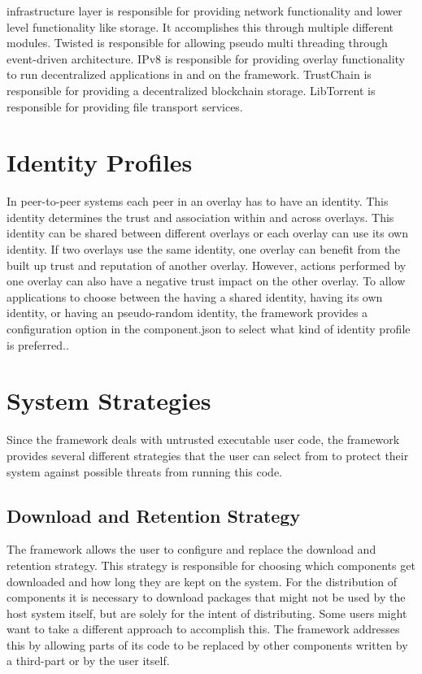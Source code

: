 infrastructure layer is responsible for providing network functionality and lower level functionality like storage. It accomplishes this through multiple different modules. Twisted is responsible for allowing pseudo multi threading through event-driven architecture. IPv8 is responsible for providing overlay functionality to run decentralized applications in and on the framework. TrustChain is responsible for providing a decentralized blockchain storage. LibTorrent is responsible for providing file transport services.

\section{Identity Profiles}

In peer-to-peer systems each peer in an overlay has to have an identity. This identity determines the trust and association within and across overlays. This identity can be shared between different overlays or each overlay can use its own identity. If two overlays use the same identity, one overlay can benefit from the built up trust and reputation of another overlay. However, actions performed by one overlay can also have a negative trust impact on the other overlay. To allow applications to choose between the having a shared identity, having its own identity, or having an pseudo-random identity,  the framework provides a configuration option in the component.json to select what kind of identity profile is preferred..  

\section{System Strategies}

Since the framework deals with untrusted executable user code, the framework provides several different strategies that the user can select from to protect their system against possible threats from running this code.

\subsection{Download and Retention Strategy}

The framework allows the user to configure and replace the download and retention strategy. This strategy is responsible for choosing which components get downloaded and how long they are kept on the system. For the distribution of components it is necessary to download packages that might not be used by the host system itself, but are solely for the intent of distributing. Some users might want to take a different approach to accomplish this. The framework addresses this by allowing parts of its code to be replaced by other components written by a third-part or by the user itself.

